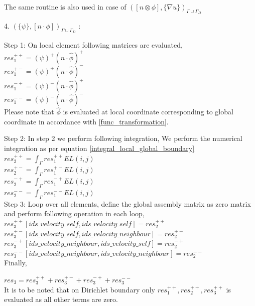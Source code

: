 \documentclass[a4paper]{book}
\begin{document}
The same routine is also used in case of $([n \otimes \phi],\lbrace \nabla u \rbrace )_{\Gamma \cup \Gamma_D}$

4. $(\lbrace \psi \rbrace, [n \cdot \phi])_{\Gamma \cup \Gamma_D}$ :

Step 1: On local element following matrices are evaluated,\\

$res_1^{++} = (\psi)^+ (n \cdot \hat{\phi})^+$\\
$res_1^{+-} = (\psi)^+ (n \cdot \hat{\phi})^-$\\
$res_1^{-+} = (\psi)^- (n \cdot \hat{\phi})^+$\\
$res_1^{--} = (\psi)^- (n \cdot \hat{\phi})^-$\\

Please note that $\hat{\phi}$ is evaluated at local coordinate corresponding to global coordinate in accordance with \ref{func_transformation}.

Step 2: In step 2 we perform following integration, 
We perform the numerical integration as per equation \ref{integral_local_global_boundary}
\\ 
$res_2^{++} = \int_{\Gamma} res_1^{++} EL(i,j)$\\
$res_2^{+-} = \int_{\Gamma} res_1^{+-} EL(i,j)$\\
$res_2^{-+} = \int_{\Gamma} res_1^{-+} EL(i,j)$\\
$res_2^{--} = \int_{\Gamma} res_1^{--} EL(i,j)$\\

Step 3: Loop over all elements, define the global assembly matrix as zero matrix and perform following operation in each loop,
\\
$res_3^{++}[ids\_velocity\_self,ids\_velocity\_self] = res_2^{++}$\\
$res_3^{+-}[ids\_velocity\_self,ids\_velocity\_neighbour] = res_2^{+-}$\\
$res_3^{-+}[ids\_velocity\_neighbour,ids\_velocity\_self] = res_2^{-+}$\\
$res_3^{--}[ids\_velocity\_neighbour,ids\_velocity\_neighbour] = res_2^{--}$\\

Finally,

$res_3 = res_3^{++} + res_3^{+-} + res_3^{-+} + res_3^{--}$\\

It is to be noted that on Dirichlet boundary only $res_1^{++}, res_2^{++}, res_3^{++}$ is evaluated as all other terms are zero.
\end{document}
